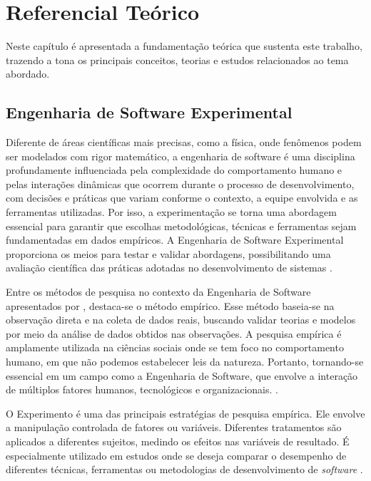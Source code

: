 \chapter[Referencial teórico]{Referencial Teórico}

Neste capítulo é apresentada a fundamentação teórica que sustenta este trabalho, trazendo a tona os principais 
conceitos, teorias e estudos relacionados ao tema abordado.

\section{Engenharia de Software Experimental}

Diferente de áreas científicas mais precisas, como a física, onde fenômenos podem ser modelados 
com rigor matemático, a engenharia de software é uma disciplina profundamente influenciada pela 
complexidade do comportamento humano e pelas interações dinâmicas que ocorrem durante o processo 
de desenvolvimento, com decisões e práticas que variam conforme o contexto, a equipe envolvida e 
as ferramentas utilizadas. Por isso, a experimentação se torna uma abordagem essencial para 
garantir que escolhas metodológicas, técnicas e ferramentas sejam fundamentadas em dados empíricos. 
A Engenharia de Software Experimental proporciona os meios para testar e validar abordagens, 
possibilitando uma avaliação científica das práticas adotadas no desenvolvimento de sistemas \cite{Wohlin:2012:ESE:2349018}.

Entre os métodos de pesquisa no contexto da Engenharia de Software apresentados por , 
destaca-se o método empírico. Esse método baseia-se na observação direta e na coleta de dados reais, buscando validar teorias 
e modelos por meio da análise de dados obtidos nas observações. A pesquisa empírica é amplamente utilizada na ciências sociais onde se tem foco no comportamento humano,
em que não podemos estabelecer leis da natureza. Portanto, tornando-se essencial em um campo como a Engenharia de Software, que envolve a interação de múltiplos fatores humanos, 
tecnológicos e organizacionais. \cite{Wohlin:2012:ESE:2349018}.

O Experimento é uma das principais estratégias de pesquisa empírica. Ele envolve a manipulação controlada de fatores ou variáveis.
Diferentes tratamentos são aplicados a diferentes sujeitos, medindo os efeitos nas variáveis de resultado. É especialmente
utilizado em estudos onde se deseja comparar o desempenho de diferentes técnicas, ferramentas ou metodologias de desenvolvimento de \textit{software} \cite{Wohlin:2012:ESE:2349018}.

